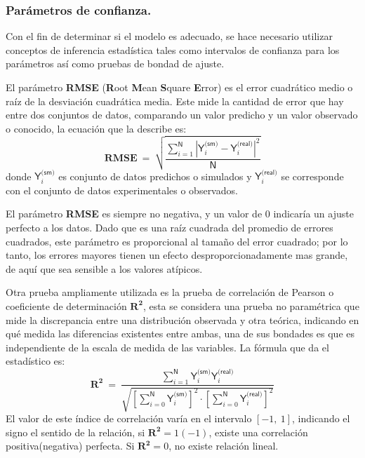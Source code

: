 \subsubsection{Parámetros de confianza.}
Con el fin de determinar si el modelo es adecuado, se hace necesario utilizar conceptos de inferencia estadística tales como intervalos de confianza para los parámetros así como pruebas de bondad de ajuste. 

El parámetro \textbf{RMSE} (\textbf{R}oot \textbf{M}ean \textbf{S}quare \textbf{E}rror) es el error cuadrático medio o raíz de la desviación cuadrática media. Este mide la cantidad de error que hay entre dos conjuntos de datos, comparando un valor predicho y un valor observado o conocido, la ecuación que la describe es:
\begin{equation}
\mathbf{RMSE} ~ = ~ \sqrt{\dfrac{\sum_{i=1}^\textsf{N} |\textsf{Y}_{i}^\textsf{(sm)}  - \textsf{Y}_{i}^\textsf{(real)}|^2}{\textsf{N}}} 
\end{equation}
donde $\textsf{Y}_{i}^\textsf{(sm)}$  es conjunto de datos predichos o simulados y $\textsf{Y}_{i}^\textsf{(real)}$ se corresponde con el conjunto de datos experimentales o observados.

El parámetro \textbf{RMSE} es siempre no negativa, y un valor de $0$ indicaría un ajuste perfecto a los datos. Dado que es una raíz cuadrada del promedio de errores cuadrados, este parámetro es proporcional al tamaño del error cuadrado; por lo tanto, los errores mayores tienen un efecto desproporcionadamente mas grande, de aquí que sea sensible a los valores atípicos.

Otra prueba ampliamente utilizada es la prueba de correlación de Pearson o coeficiente de determinación $\mathbf{R^2}$, esta se considera una prueba no paramétrica que mide la discrepancia entre una distribución observada y otra teórica, indicando en qué medida las diferencias existentes entre ambas, una de sus bondades es que es independiente de la escala de medida de las variables. La fórmula que da el estadístico es:
\begin{equation}
\mathbf{R^2} ~ = ~ \dfrac{\sum_{i=1}^\textsf{N} \textsf{Y}_{i}^\textsf{(sm)} \textsf{Y}_{i}^\textsf{(real)}}{\sqrt{\left[\sum_{i=0}^\textsf{N} \textsf{Y}_{i}^\textsf{(sm)}\right]^2 \cdot \left[\sum_{i=0}^\textsf{N} \textsf{Y}_{i}^\textsf{(real)}\right]^2}}
\end{equation}  
El valor de este índice de correlación varía en el intervalo $[-1,~1]$, indicando el signo el sentido de la relación, si $\mathbf{R^2} = 1(-1)$, existe una correlación positiva(negativa) perfecta. Si $\mathbf{R^2} = 0$, no existe relación lineal.

